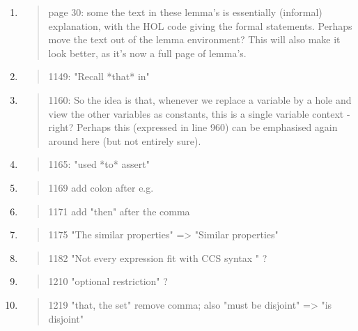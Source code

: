 \begin{enumerate}
  \item \begin{quote}
page 30: some the text in these lemma's is essentially (informal) explanation, with the HOL code giving the formal statements. Perhaps move the text out of the lemma environment? This will also make it look better, as it's now a full page of lemma's. 
\end{quote}
  \Mark

  \item \begin{quote}
1149: "Recall *that* in"
\end{quote}
  \Mark

  \item \begin{quote}
1160: So the idea is that, whenever we replace a variable by a hole and view the other variables as constants, this is a single variable context - right? Perhaps this (expressed in line 960) can be emphasised again around here (but not entirely sure). 
\end{quote}
  \Mark

  \item \begin{quote}
1165: "used *to* assert"
\end{quote}
  \Mark

  \item \begin{quote}
1169 add colon after e.g.
\end{quote}
  \Mark

  \item \begin{quote}
1171 add "then" after the comma 
\end{quote}
  \Mark

  \item \begin{quote}
1175 "The similar properties" => "Similar properties"
\end{quote}
  \Mark

  \item \begin{quote}
1182 "Not every expression fit with CCS syntax " ?
\end{quote}
  \Mark

  \item \begin{quote}
1210 "optional restriction" ?
\end{quote}
  \Mark

  \item \begin{quote}
1219 "that, the set" remove comma; also "must be disjoint" => "is disjoint"
\end{quote}
  \Mark


\end{enumerate}

